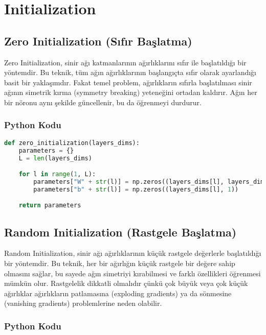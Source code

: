 \section{Initialization}

\subsection{Zero Initialization (Sıfır Başlatma)}
Zero Initialization, sinir ağı katmanlarının ağırlıklarını sıfır ile başlatıldığı bir yöntemdir. Bu teknik, tüm ağın ağırlıklarının başlangıçta sıfır olarak ayarlandığı basit bir yaklaşımdır. Fakat temel problem, ağırlıkların sıfırla başlatılması sinir ağının simetrik kırma (symmetry breaking) yeteneğini ortadan kaldırır. Ağın her bir nöronu aynı şekilde güncellenir, bu da öğrenmeyi durdurur.

\subsubsection{Python Kodu}

\begin{lstlisting}[language=Python]
def zero_initialization(layers_dims):
    parameters = {}
    L = len(layers_dims)

    for l in range(1, L):
        parameters["W" + str(l)] = np.zeros((layers_dims[l], layers_dims[l - 1]))
        parameters["b" + str(l)] = np.zeros((layers_dims[l], 1))

    return parameters
\end{lstlisting}

\newpage

\subsection{Random Initialization (Rastgele Başlatma)}
Random Initialization, sinir ağı ağırlıklarının küçük rastgele değerlerle başlatıldığı bir yöntemdir. Bu teknik, her bir ağırlığın küçük rastgele bir değere sahip olmasını sağlar, bu sayede ağın simetriyi kırabilmesi ve farklı özellikleri öğrenmesi mümkün olur. Rastgelelik dikkatli olmalıdır çünkü çok büyük veya çok küçük ağırlıklar ağırlıkların patlamasına (exploding gradients) ya da sönmesine (vanishing gradients) problemlerine neden olabilir.

\subsubsection{Python Kodu}

